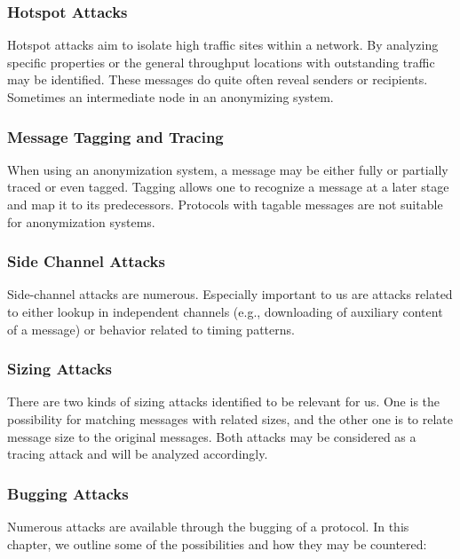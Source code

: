 \subsubsection{Hotspot Attacks}
Hotspot attacks aim to isolate high traffic sites within a network. By analyzing specific properties or the general throughput locations with outstanding traffic may be identified. These messages do quite often reveal senders or recipients. Sometimes an intermediate node in an anonymizing system. 

\subsubsection{Message Tagging and Tracing}
When using an anonymization system, a message may be either fully or partially traced or even tagged. Tagging allows one to recognize a message at a later stage and map it to its predecessors. Protocols with tagable messages are not suitable for anonymization systems.

\subsubsection{Side Channel Attacks}
Side-channel attacks are numerous. Especially important to us are attacks related to either lookup in independent channels (e.g., downloading of auxiliary content of a message) or behavior related to timing patterns.

\subsubsection{Sizing Attacks}
There are two kinds of sizing attacks identified to be relevant for us. One is the possibility for matching messages with related sizes, and the other one is to relate message size to the original messages. Both attacks may be considered as a tracing attack and will be analyzed accordingly.

\subsubsection{Bugging Attacks}
Numerous attacks are available through the bugging of a protocol. In this chapter, we outline some of the possibilities and how they may be countered:

